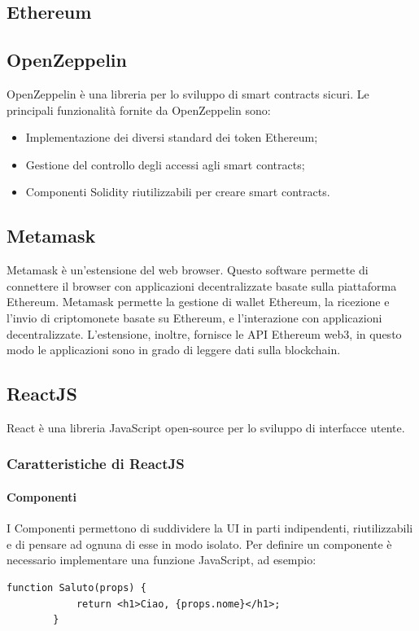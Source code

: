\documentclass[a4paper]{article}
\begin{document}
    \subsection{Ethereum}
    \subsection{OpenZeppelin}
    OpenZeppelin è una libreria per lo sviluppo di smart contracts sicuri. Le principali funzionalità fornite da OpenZeppelin sono:
    \begin{itemize}
    \item Implementazione dei diversi standard dei token Ethereum;
    \item Gestione del controllo degli accessi agli smart contracts;
    \item Componenti Solidity riutilizzabili per creare smart contracts.
    \end{itemize}
    \subsection{Metamask}
    Metamask è un'estensione del web browser. Questo software permette di connettere il browser con
    applicazioni decentralizzate basate sulla piattaforma Ethereum. Metamask permette la gestione di
    wallet Ethereum, la ricezione e l'invio di criptomonete basate su Ethereum, e l'interazione con
    applicazioni decentralizzate. L'estensione, inoltre, fornisce le API Ethereum web3, in questo
    modo le applicazioni sono in grado di leggere dati sulla blockchain.
    \subsection{ReactJS}
    React è una libreria JavaScript open-source per lo sviluppo di interfacce utente.
    \subsubsection{Caratteristiche di ReactJS}
    \paragraph{Componenti}
    I Componenti permettono di suddividere la UI in parti indipendenti, riutilizzabili e di pensare ad ognuna di esse in modo isolato.
    Per definire un componente è necessario implementare una funzione JavaScript, ad esempio:

    \begin{lstlisting}[style=ES6, title={Esempio componente}]
        function Saluto(props) {
            return <h1>Ciao, {props.nome}</h1>;
        }\end{lstlisting}
\end{document}
